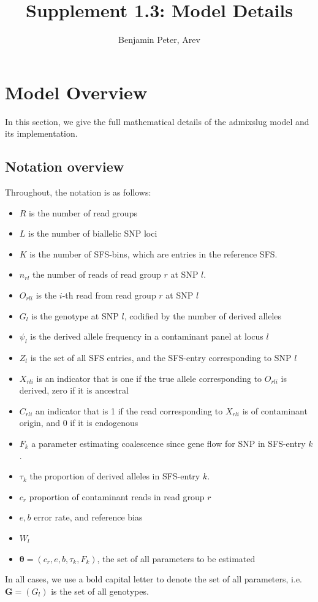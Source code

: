 \documentclass[10pt,a4paper]{article}
\author{Benjamin Peter, Arev}
\title{Supplement 1.3: Model Details}
\newcommand{\BFG}{\mathbf{G}}
\begin{document}
	\maketitle
\section*{Model Overview}
In this section, we give the full mathematical details of the admixslug model and its implementation.
	
\subsection*{Notation overview}
	Throughout, the notation is as follows: 
	\begin{itemize}
		\item $R$ is the number of read groups
		\item $L$ is the number of biallelic SNP loci
		\item $K$ is the number of SFS-bins, which are entries in the reference SFS. 
		\item $n_{rl}$ the number of reads of read group $r$ at SNP $l$.
		\item $O_{rli}$ is the $i$-th read from read group $r$ at SNP $l$
		\item $G_{l}$ is the genotype at SNP $l$, codified by the number of derived alleles
		\item $\psi_l$ is the derived allele frequency in a contaminant panel at locus $l$
		\item $Z_{l}$ is the set of all SFS entries, and the SFS-entry corresponding to SNP $l$
		\item $X_{rli}$ is an indicator that is one if the true allele corresponding to $O_{rli}$ is derived, zero if it is ancestral
		\item $C_{rli}$ an indicator that is 1 if the read corresponding to $X_{rli}$ is of contaminant origin, and 0 if it is endogenous
		\item $F_k$ a parameter estimating coalescence since gene flow for SNP in SFS-entry $k$.
		\item $\tau_k$ the proportion of derived alleles in SFS-entry $k$.		
		\item $c_r$ proportion of contaminant reads in read group $r$
		\item $e,b$  error rate, and reference bias
		\item $W_l$ 
		\item $\mathbf{\theta} = (c_r, e, b, \tau_k, F_k)$, the set of all parameters to be estimated
	\end{itemize}
In all cases, we use a bold capital letter to denote the set of all parameters, i.e. $\BFG = (G_l)$ is the set of all genotypes.
\end{document}
